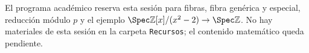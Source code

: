\begin{nota}
El programa académico reserva esta sesión para fibras, fibra genérica y especial, reducción módulo $p$ y el ejemplo $\Spec\mathbb Z[x]/(x^2-2)\to\Spec\mathbb Z$. No hay materiales de esta sesión en la carpeta \texttt{Recursos}; el contenido matemático queda pendiente.
\end{nota}
